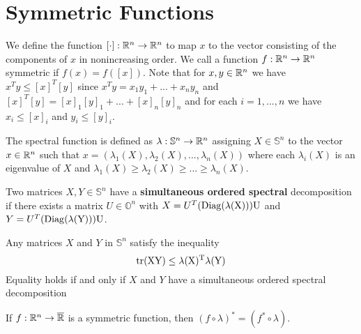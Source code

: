 \chapter{Symmetric Functions}

We define the function $[\cdot]: \Bbb R^n \rightarrow \Bbb R^n$ to map $x$ to the vector consisting of the components of $x$ in nonincreasing order. We call a function $f: \Bbb R^n \rightarrow \Bbb R^n$ symmetric if $f(x) = f([x])$. Note that for $x, y \in \Bbb R^n$ we have $x^T y \leq [x]^T [y]$ since $x^T y = x_1 y_1 + ... + x_n y_n$ and $[x]^T [y] = [x]_1 [y]_1 + ... + [x]_n [y]_n$ and for each $i = 1, ..., n$ we have $x_i \leq [x]_i$ and $y_i \leq [y]_i$.

\begin{definition}
The spectral function is defined as $\lambda: \mathbb{S}^n \rightarrow \Bbb R^n$ assigning $X \in \mathbb{S}^n$ to the vector $x \in \Bbb R^n$ such that $x = (\lambda_1(X), \lambda_2(X), ..., \lambda_n(X))$ where each $\lambda_i(X)$ is an eigenvalue of $X$ and $\lambda_1(X) \geq \lambda_2(X) \geq ... \geq \lambda_n(X)$.
\end{definition}

\begin{definition}
Two matrices $X, Y \in \mathbb{S}^n$ have a \textbf{simultaneous ordered spectral} decomposition if there exists a matrix $U \in \mathbb{O}^n$ with $X = U^T(\rm{Diag}(\lambda(X)))U$ and $Y = U^T(\rm{Diag}(\lambda(Y)))U$.
\end{definition}

\begin{theorem}
Any matrices $X$ and $Y$ in $\mathbb{S}^n$ satisfy the inequality
\begin{equation*}
\rm{tr}(XY) \leq \lambda(X)^T \lambda(Y)
\end{equation*}
Equality holds if and only if $X$ and $Y$ have a simultaneous ordered spectral decomposition
\end{theorem}

\begin{theorem}
If $f: \Bbb R^n \rightarrow \overline{\Bbb R}$ is a symmetric function, then $(f \circ \lambda)^* = (f^* \circ \lambda)$.
\end{theorem}

